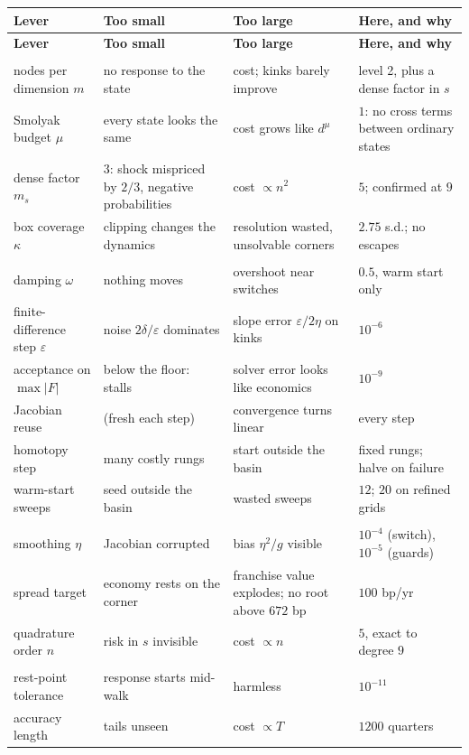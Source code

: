 \documentclass[10pt,a4paper]{article}
\theoremstyle{plain}
\theoremstyle{remark}
\begin{document}
\begin{center}\small
\begin{longtable}{@{}>{\raggedright\arraybackslash}p{}>{\raggedright\arraybackslash}p{}>{\raggedright\arraybackslash}p{}>{\raggedright\arraybackslash}p{}@{}}
\toprule
\textbf{Lever} & \textbf{Too small} & \textbf{Too large} & \textbf{Here, and why} \\
\midrule
\endfirsthead
\toprule
\textbf{Lever} & \textbf{Too small} & \textbf{Too large} & \textbf{Here, and why} \\
\midrule
\endhead
\multicolumn{4}{@{}l}{\emph{Representing the rule}}\\[2pt]
nodes per dimension $m$ & no response to the state & cost; kinks barely improve & level 2, plus a dense factor in $s$ \\
Smolyak budget $\mu$ & every state looks the same & cost grows like $d^{\mu}$ & $1$: no cross terms between ordinary states \\
dense factor $m_s$ & $3$: shock mispriced by $2/3$, negative probabilities & cost $\propto n^2$ & $5$; confirmed at $9$ \\
box coverage $\kappa$ & clipping changes the dynamics & resolution wasted, unsolvable corners & $2.75$ s.d.; no escapes \\
\addlinespace
\multicolumn{4}{@{}l}{\emph{Solving}}\\[2pt]
damping $\omega$ & nothing moves & overshoot near switches & $0.5$, warm start only \\
finite-difference step $\varepsilon$ & noise $2\delta/\varepsilon$ dominates & slope error $\varepsilon/2\eta$ on kinks & $10^{-6}$ \\
acceptance on $\max|F|$ & below the floor: stalls & solver error looks like economics & $10^{-9}$ \\
Jacobian reuse & (fresh each step) & convergence turns linear & every step \\
homotopy step & many costly rungs & start outside the basin & fixed rungs; halve on failure \\
warm-start sweeps & seed outside the basin & wasted sweeps & $12$; $20$ on refined grids \\
\addlinespace
\multicolumn{4}{@{}l}{\emph{Nonsmoothness and expectations}}\\[2pt]
smoothing $\eta$ & Jacobian corrupted & bias $\eta^2/g$ visible & $10^{-4}$ (switch), $10^{-5}$ (guards) \\
spread target & economy rests on the corner & franchise value explodes; no root above $672$ bp & $100$ bp/yr \\
quadrature order $n$ & risk in $s$ invisible & cost $\propto n$ & $5$, exact to degree $9$ \\
\addlinespace
\multicolumn{4}{@{}l}{\emph{Reading}}\\[2pt]
rest-point tolerance & response starts mid-walk & harmless & $10^{-11}$ \\
accuracy length & tails unseen & cost $\propto T$ & $1200$ quarters \\
\bottomrule
\end{longtable}
\end{center}
\end{document}
